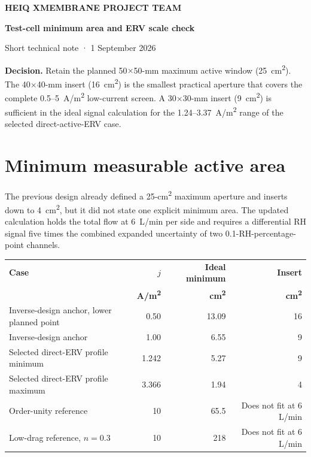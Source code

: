 \documentclass[9pt,a4paper]{article}
\newcommand{\sans}{\fontfamily{qhv}\selectfont}
\begin{document}
\begin{tcolorbox}[enhanced,colback=Navy,colframe=Navy,boxrule=0pt,arc=0mm,left=8mm,right=8mm,top=5mm,bottom=5mm]
{\sans\bfseries\small\color{white}HEIQ XMEMBRANE PROJECT TEAM}\par
\vspace{2mm}
{\sans\bfseries\fontsize{20}{23}\selectfont\color{white}Test-cell minimum area and ERV scale check}\par
\vspace{1.5mm}
{\sans\color{white}Short technical note · 1 September 2026}
\end{tcolorbox}

\begin{mainbox}
\textbf{Decision.} Retain the planned 50$\times$50-mm maximum active window
(25~cm\textsuperscript{2}). The 40$\times$40-mm insert
(16~cm\textsuperscript{2}) is the smallest practical aperture that covers the
complete 0.5--5~A/m\textsuperscript{2} low-current screen. A
30$\times$30-mm insert (9~cm\textsuperscript{2}) is sufficient in the ideal
signal calculation for the 1.24--3.37~A/m\textsuperscript{2} range of the
selected direct-active-ERV case.
\end{mainbox}

\section{Minimum measurable active area}

The previous design already defined a 25-cm\textsuperscript{2} maximum aperture
and inserts down to 4~cm\textsuperscript{2}, but it did not state one explicit
minimum area. The updated calculation holds the total flow at 6~L/min per side
and requires a differential RH signal five times the combined expanded
uncertainty of two 0.1-RH-percentage-point channels.

\begin{tabularx}{\textwidth}{@{}Yrrr@{}}
\toprule
\textbf{Case} & \textbf{$j$} & \textbf{Ideal minimum} & \textbf{Insert} \\
 & \textbf{A/m\textsuperscript{2}} & \textbf{cm\textsuperscript{2}} & \textbf{cm\textsuperscript{2}} \\
\midrule
Inverse-design anchor, lower planned point & 0.50 & 13.09 & 16 \\
Inverse-design anchor & 1.00 & 6.55 & 9 \\
Selected direct-ERV profile minimum & 1.242 & 5.27 & 9 \\
Selected direct-ERV profile maximum & 3.366 & 1.94 & 4 \\
Order-unity reference & 10 & 65.5 & Does not fit at 6 L/min \\
Low-drag reference, $n=0.3$ & 10 & 218 & Does not fit at 6 L/min \\
\bottomrule
\end{tabularx}
\end{document}
